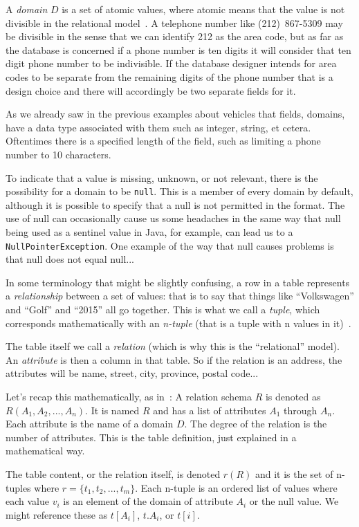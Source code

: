 A \textit{domain} $D$ is a set of atomic values, where atomic means that the value is not divisible in the relational model~\cite{fds}. A telephone number like {(212)~867-5309} may be divisible in the sense that we can identify 212 as the area code, but as far as the database is concerned if a phone number is ten digits it will consider that ten digit phone number to be indivisible. If the database designer intends for area codes to be separate from the remaining digits of the phone number that is a design choice and there will accordingly be two separate fields for it. 

As we already saw in the previous examples about vehicles that fields, domains, have a data type associated with them such as integer, string, et cetera. Oftentimes there is a specified length of the field, such as limiting a phone number to 10 characters. 

To indicate that a value is missing, unknown, or not relevant, there is the possibility for a domain to be \texttt{null}. This is a member of every domain by default, although it is possible to specify that a null is not permitted in the format. The use of null can occasionally cause us some headaches in the same way that null being used as a sentinel value in Java, for example, can lead us to a \texttt{NullPointerException}. One example of the way that null causes problems is that null does not equal null... 

In some terminology that might be slightly confusing, a row in a table represents a \textit{relationship} between a set of values: that is to say that things like ``Volkswagen'' and ``Golf'' and ``2015'' all go together. This is what we call a \textit{tuple}, which corresponds mathematically with an \textit{n-tuple} (that is a tuple with n values in it)~\cite{dsc}. 

The table itself we call a \textit{relation} (which is why this is the ``relational'' model). An \textit{attribute} is then a column in that table. So if the relation is an address, the attributes will be name, street, city, province, postal code... 

Let's recap this mathematically, as in~\cite{fds}: A relation schema $R$ is denoted as $R(A_{1}, A_{2}, ..., A_{n})$. It is named $R$ and has a list of attributes $A_{1}$ through $A_{n}$. Each attribute is the name of a domain $D$. The degree of the relation is the number of attributes. This is the table definition, just explained in a mathematical way.

The table content, or the relation itself, is denoted $r(R)$ and it is the set of n-tuples where $r = \{t_{1}, t_{2}, ..., t_{m}\}$. Each n-tuple is an ordered list of values where each value $v_{i}$ is an element of the domain of attribute $A_{i}$ or the null value. We might reference these as $t[A_{i}]$, $t.A_{i}$, or $t[i]$. 

